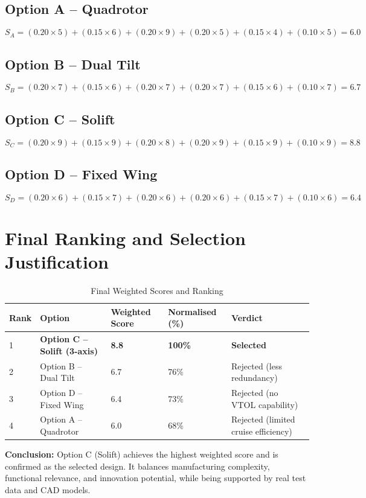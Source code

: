 \subsection{Option A -- Quadrotor}


\[
S_A = (0.20 \times 5) + (0.15 \times 6) + (0.20 \times 9) + (0.20 \times 5) + (0.15 \times 4) + (0.10 \times 5) = \mathbf{6.0}
\]



\subsection{Option B -- Dual Tilt}


\[
S_B = (0.20 \times 7) + (0.15 \times 6) + (0.20 \times 7) + (0.20 \times 7) + (0.15 \times 6) + (0.10 \times 7) = \mathbf{6.7}
\]



\subsection{Option C -- Solift}


\[
S_C = (0.20 \times 9) + (0.15 \times 9) + (0.20 \times 8) + (0.20 \times 9) + (0.15 \times 9) + (0.10 \times 9) = \mathbf{8.8}
\]



\subsection{Option D -- Fixed Wing}


\[
S_D = (0.20 \times 6) + (0.15 \times 7) + (0.20 \times 6) + (0.20 \times 6) + (0.15 \times 7) + (0.10 \times 6) = \mathbf{6.4}
\]



\section{Final Ranking and Selection Justification}

\begin{table}[H]
\centering
\small
\caption{Final Weighted Scores and Ranking}
\label{tab:matrix_final}
\begin{tabularx}{\textwidth}{C{1cm} L{3.8cm} C{2cm} C{1.8cm} X}
\toprule
\textbf{Rank} & \textbf{Option} & \textbf{Weighted Score} & \textbf{Normalised (\%)} & \textbf{Verdict} \\
 & \textbf{Option C -- Solift (3-axis)} & \textbf{8.8} & \textbf{100\%} & \textbf{Selected} \\
2 & Option B -- Dual Tilt & 6.7 & 76\% & Rejected (less redundancy) \\
3 & Option D -- Fixed Wing & 6.4 & 73\% & Rejected (no VTOL capability) \\
4 & Option A -- Quadrotor & 6.0 & 68\% & Rejected (limited cruise efficiency) \\
\bottomrule
\end{tabularx}
\end{table}

\noindent \textbf{Conclusion:} Option C (Solift) achieves the highest weighted score and is confirmed as the selected design. It balances manufacturing complexity, functional relevance, and innovation potential, while being supported by real test data and CAD models.
